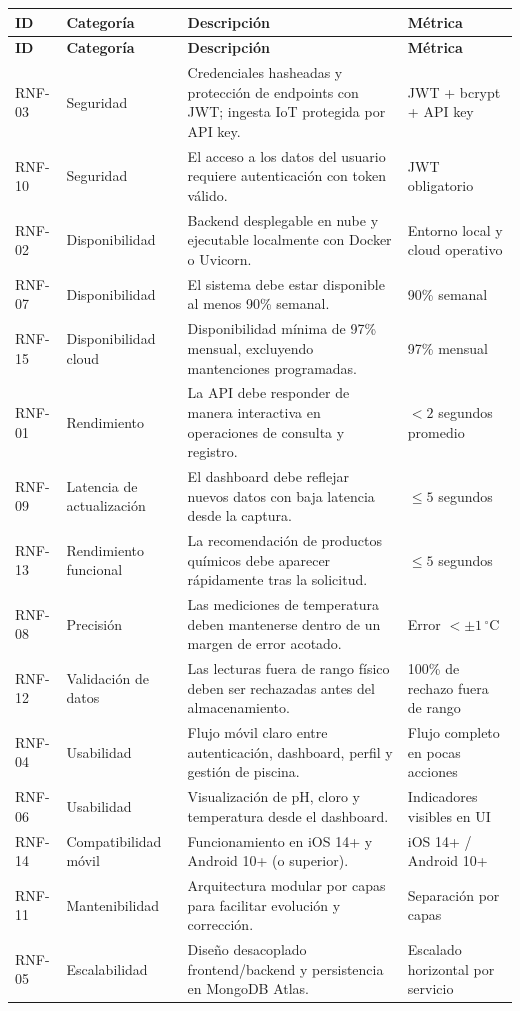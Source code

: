 \documentclass[11pt, a4paper]{article}
\begin{document}
\begin{longtable}{@{} p{1.5cm} p{3cm} p{8cm} p{2cm} @{}}
  \toprule
  \textbf{ID} & \textbf{Categoría} & \textbf{Descripción} & \textbf{Métrica} \\
  \midrule
  \endfirsthead
  \toprule
  \textbf{ID} & \textbf{Categoría} & \textbf{Descripción} & \textbf{Métrica} \\
  \midrule
  \endhead
  RNF-03 & Seguridad & Credenciales hasheadas y protección de endpoints con JWT; ingesta IoT protegida por API key. & JWT + bcrypt + API key \\
  RNF-10 & Seguridad & El acceso a los datos del usuario requiere autenticación con token válido. & JWT obligatorio \\
  RNF-02 & Disponibilidad & Backend desplegable en nube y ejecutable localmente con Docker o Uvicorn. & Entorno local y cloud operativo \\
  RNF-07 & Disponibilidad & El sistema debe estar disponible al menos 90\% semanal. & 90\% semanal \\
  RNF-15 & Disponibilidad cloud & Disponibilidad mínima de 97\% mensual, excluyendo mantenciones programadas. & 97\% mensual \\
  RNF-01 & Rendimiento & La API debe responder de manera interactiva en operaciones de consulta y registro. & $< 2$ segundos promedio \\
  RNF-09 & Latencia de actualización & El dashboard debe reflejar nuevos datos con baja latencia desde la captura. & $\leq 5$ segundos \\
  RNF-13 & Rendimiento funcional & La recomendación de productos químicos debe aparecer rápidamente tras la solicitud. & $\leq 5$ segundos \\
  RNF-08 & Precisión & Las mediciones de temperatura deben mantenerse dentro de un margen de error acotado. & Error $< \pm1\,^{\circ}\mathrm{C}$ \\
  RNF-12 & Validación de datos & Las lecturas fuera de rango físico deben ser rechazadas antes del almacenamiento. & 100\% de rechazo fuera de rango \\
  RNF-04 & Usabilidad & Flujo móvil claro entre autenticación, dashboard, perfil y gestión de piscina. & Flujo completo en pocas acciones \\
  RNF-06 & Usabilidad & Visualización de pH, cloro y temperatura desde el dashboard. & Indicadores visibles en UI \\
  RNF-14 & Compatibilidad móvil & Funcionamiento en iOS 14+ y Android 10+ (o superior). & iOS 14+ / Android 10+ \\
  RNF-11 & Mantenibilidad & Arquitectura modular por capas para facilitar evolución y corrección. & Separación por capas \\
  RNF-05 & Escalabilidad & Diseño desacoplado frontend/backend y persistencia en MongoDB Atlas. & Escalado horizontal por servicio \\
  \bottomrule
\end{longtable}
\end{document}
